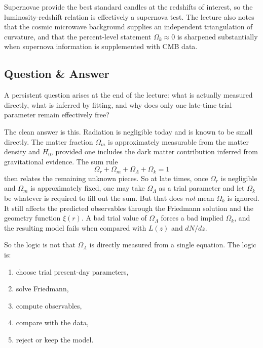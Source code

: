 Supernovae provide the best standard candles at the redshifts of interest, so the luminosity-redshift relation is effectively a supernova test. The lecture also notes that the cosmic microwave background supplies an independent triangulation of curvature, and that the percent-level statement \(\Omega_k\approx 0\) is sharpened substantially when supernova information is supplemented with CMB data.

\subsection{Question \& Answer}

A persistent question arises at the end of the lecture: what is actually measured directly, what is inferred by fitting, and why does only one late-time trial parameter remain effectively free?

The clean answer is this. Radiation is negligible today and is known to be small directly. The matter fraction \(\Omega_m\) is approximately measurable from the matter density and \(H_0\), provided one includes the dark matter contribution inferred from gravitational evidence. The sum rule
\begin{equation}
\Omega_r+\Omega_m+\Omega_\Lambda+\Omega_k=1
\end{equation}
then relates the remaining unknown pieces. So at late times, once \(\Omega_r\) is negligible and \(\Omega_m\) is approximately fixed, one may take \(\Omega_\Lambda\) as a trial parameter and let \(\Omega_k\) be whatever is required to fill out the sum. But that does \emph{not} mean \(\Omega_k\) is ignored. It still affects the predicted observables through the Friedmann solution and the geometry function \(\xi(r)\). A bad trial value of \(\Omega_\Lambda\) forces a bad implied \(\Omega_k\), and the resulting model fails when compared with \(L(z)\) and \(dN/dz\).

So the logic is not that \(\Omega_\Lambda\) is directly measured from a single equation. The logic is:
\begin{enumerate}
\item choose trial present-day parameters,
\item solve Friedmann,
\item compute observables,
\item compare with the data,
\item reject or keep the model.
\end{enumerate}

